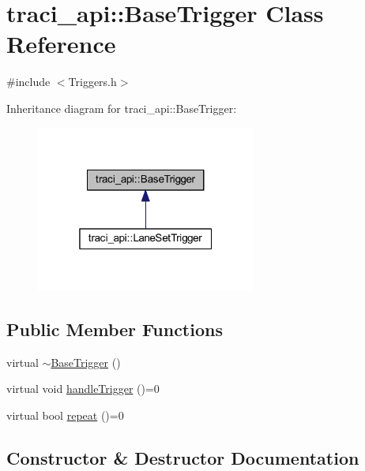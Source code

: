 \hypertarget{classtraci__api_1_1_base_trigger}{}\section{traci\+\_\+api\+:\+:Base\+Trigger Class Reference}
\label{classtraci__api_1_1_base_trigger}


{\ttfamily \#include $<$Triggers.\+h$>$}



Inheritance diagram for traci\+\_\+api\+:\+:Base\+Trigger\+:\nopagebreak
\begin{figure}[H]
\begin{center}
\leavevmode
\includegraphics[width=205pt]{classtraci__api_1_1_base_trigger__inherit__graph}
\end{center}
\end{figure}
\subsection*{Public Member Functions}
\begin{DoxyCompactItemize}
\item 
virtual \hyperlink{classtraci__api_1_1_base_trigger_ae1e572064f6b16fa1de9e5416b6c1a9c}{$\sim$\+Base\+Trigger} ()
\item 
virtual void \hyperlink{classtraci__api_1_1_base_trigger_a2de2824fb1d228d4c04aa15c272017a5}{handle\+Trigger} ()=0
\item 
virtual bool \hyperlink{classtraci__api_1_1_base_trigger_a7d2b1ac3f54e42e71eae69f1c7f33943}{repeat} ()=0
\end{DoxyCompactItemize}


\subsection{Constructor \& Destructor Documentation}
\mbox{\label{classtraci__api_1_1_base_trigger_ae1e572064f6b16fa1de9e5416b6c1a9c}} 
